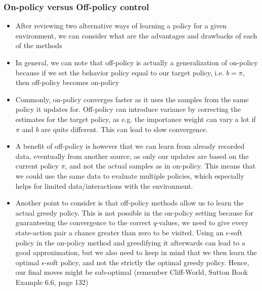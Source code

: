 \subsubsection{On-policy versus Off-policy control}
\label{sec:value_based_tabular_on_off_policy}
\begin{itemize}
	\item After reviewing two alternative ways of learning a policy for a given environment, we can consider what are the advantages and drawbacks of each of the methods
	\item In general, we can note that off-policy is actually a generalization of on-policy because if we set the behavior policy equal to our target policy, i.e. $b=\pi$, then off-policy becomes on-policy
	\item Commonly, on-policy converges faster as it uses the samples from the same policy it updates for. Off-policy can introduce variance by correcting the estimates for the target policy, as e.g. the importance weight can vary a lot if $\pi$ and $b$ are quite different. This can lead to slow convergence.
	\item A benefit of off-policy is however that we can learn from already recorded data, eventually from another source, as only our updates are based on the current policy $\pi$, and not the actual samples as in on-policy. This means that we could use the same data to evaluate multiple policies, which especially helps for limited data/interactions with the environment.
	\item Another point to consider is that off-policy methods allow us to learn the actual greedy policy. This is not possible in the on-policy setting because for guaranteeing the convergence to the correct $q$-values, we need to give every state-action pair a chance greater than zero to be visited. Using an $\epsilon$-soft policy in the on-policy method and greedifying it afterwards can lead to a good approximation, but we also need to keep in mind that we then learn the optimal $\epsilon$-soft policy, and not the strictly the optimal greedy policy. Hence, our final moves might be sub-optimal (remember Cliff-World, Sutton Book Example 6.6, page 132)
\end{itemize}

